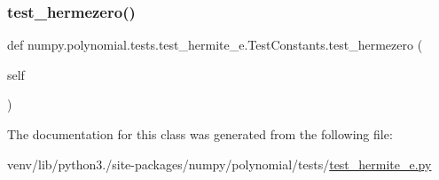 \subsubsection{\texorpdfstring{test\+\_\+hermezero()}{test\_hermezero()}}
{\footnotesize\ttfamily def numpy.\+polynomial.\+tests.\+test\+\_\+hermite\+\_\+e.\+Test\+Constants.\+test\+\_\+hermezero (\begin{DoxyParamCaption}\item[{}]{self }\end{DoxyParamCaption})}



The documentation for this class was generated from the following file\+:\begin{DoxyCompactItemize}
\item 
venv/lib/python3./site-\/packages/numpy/polynomial/tests/\hyperlink{test__hermite__e_8py}{test\+\_\+hermite\+\_\+e.\+py}\end{DoxyCompactItemize}
